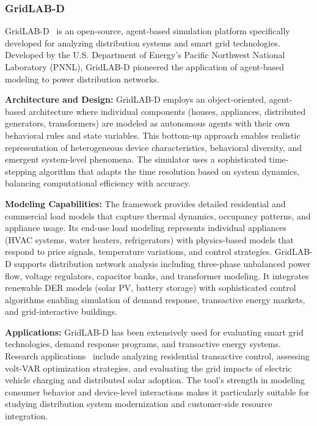 \subsubsection{GridLAB-D}

GridLAB-D~\cite{gridlabd} is an open-source, agent-based simulation platform specifically developed for analyzing distribution systems and smart grid technologies. Developed by the U.S. Department of Energy's Pacific Northwest National Laboratory (PNNL), GridLAB-D pioneered the application of agent-based modeling to power distribution networks.

\textbf{Architecture and Design:} GridLAB-D employs an object-oriented, agent-based architecture where individual components (houses, appliances, distributed generators, transformers) are modeled as autonomous agents with their own behavioral rules and state variables. This bottom-up approach enables realistic representation of heterogeneous device characteristics, behavioral diversity, and emergent system-level phenomena. The simulator uses a sophisticated time-stepping algorithm that adapts the time resolution based on system dynamics, balancing computational efficiency with accuracy.

\textbf{Modeling Capabilities:} The framework provides detailed residential and commercial load models that capture thermal dynamics, occupancy patterns, and appliance usage. Its end-use load modeling represents individual appliances (HVAC systems, water heaters, refrigerators) with physics-based models that respond to price signals, temperature variations, and control strategies. GridLAB-D supports distribution network analysis including three-phase unbalanced power flow, voltage regulators, capacitor banks, and transformer modeling. It integrates renewable DER models (solar PV, battery storage) with sophisticated control algorithms enabling simulation of demand response, transactive energy markets, and grid-interactive buildings.

\textbf{Applications:} GridLAB-D has been extensively used for evaluating smart grid technologies, demand response programs, and transactive energy systems. Research applications~\cite{gridlabd_application} include analyzing residential transactive control, assessing volt-VAR optimization strategies, and evaluating the grid impacts of electric vehicle charging and distributed solar adoption. The tool's strength in modeling consumer behavior and device-level interactions makes it particularly suitable for studying distribution system modernization and customer-side resource integration.


